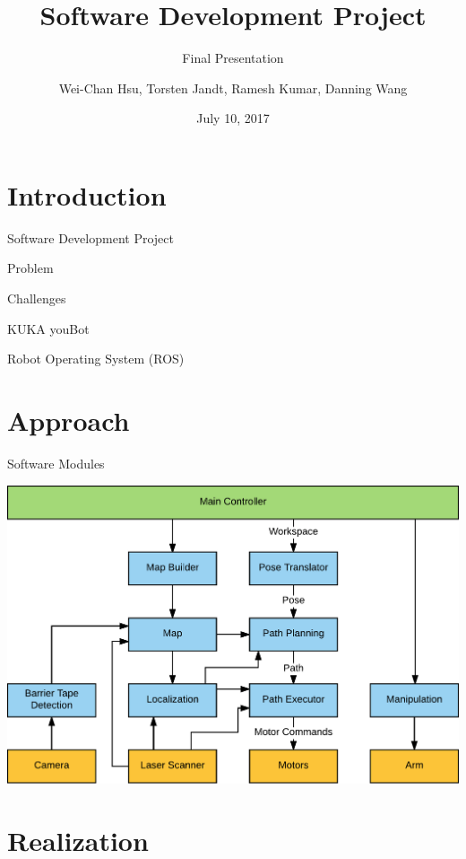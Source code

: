 \documentclass[10pt,aspectratio=43,xcolor={usenames,dvipsnames,table}]{beamer}
\title{Software Development Project}
\subtitle{Final Presentation}
\author{Wei-Chan Hsu, Torsten Jandt, Ramesh Kumar, Danning Wang}
\date{July 10, 2017}
\begin{document}
\begin{frame}
\titlepage
\end{frame}

\section{Introduction}
\begin{frame}{Software Development Project}
\end{frame}
\begin{frame}{Problem}
\end{frame}
\begin{frame}{Challenges}
\end{frame}
\begin{frame}{KUKA youBot}
\end{frame}
\begin{frame}{Robot Operating System (ROS)}
\end{frame}

\section{Approach}
\begin{frame}{Software Modules}
    \begin{center}
        \includegraphics[width=\linewidth,height=0.9\textheight,keepaspectratio]{gfx/software_modules.pdf}
    \end{center}
\end{frame}

\section{Realization}
\end{document}
